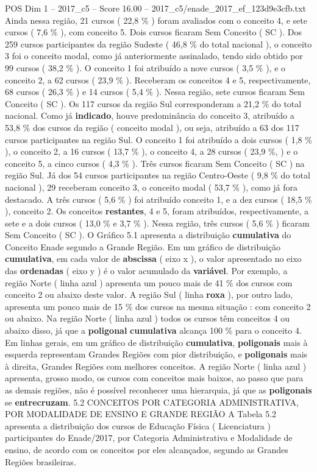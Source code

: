 \begin{textsample}{POS Dim 1 – 2017\_c5 – Score 16.00 – 2017\_c5/enade\_2017\_ef\_123d9e3cfb.txt}
Ainda nessa região, 21 cursos ( 22,8 \% ) foram avaliados com o conceito 4, e sete cursos ( 7,6 \% ), com conceito 5.
Dois cursos ficaram Sem Conceito ( SC ).
Dos 259 cursos participantes da região Sudeste ( 46,8 \% do total nacional ), o conceito 3 foi o conceito modal, como já anteriormente assinalado, tendo sido obtido por 99 cursos ( 38,2 \% ).
O conceito 1 foi atribuído a nove cursos ( 3,5 \% ), e o conceito 2, a 62 cursos ( 23,9 \% ).
Receberam os conceitos 4 e 5, respectivamente, 68 cursos ( 26,3 \% ) e 14 cursos ( 5,4 \% ).
Nessa região, sete cursos ficaram Sem Conceito ( SC ).
Os 117 cursos da região Sul corresponderam a 21,2 \% do total nacional.
Como já \textbf{indicado}, houve predominância do conceito 3, atribuído a 53,8 \% dos cursos da região ( conceito modal ), ou seja, atribuído a 63 dos 117 cursos participantes na região Sul.
O conceito 1 foi atribuído a dois cursos ( 1,8 \% ), o conceito 2, a 16 cursos ( 13,7 \% ), o conceito 4, a 28 cursos ( 23,9 \%, ) e o conceito 5, a cinco cursos ( 4,3 \% ).
Três cursos ficaram Sem Conceito ( SC ) na região Sul.
Já dos 54 cursos participantes na região Centro-Oeste ( 9,8 \% do total nacional ), 29 receberam conceito 3, o conceito modal ( 53,7 \% ), como já fora destacado.
A três cursos ( 5,6 \% ) foi atribuído conceito 1, e a dez cursos ( 18,5 \% ), conceito 2.
Os conceitos \textbf{restantes}, 4 e 5, foram atribuídos, respectivamente, a sete e a dois cursos ( 13,0 \% e 3,7 \% ).
Nessa região, três cursos ( 5,6 \% ) ficaram Sem Conceito ( SC ).
O Gráfico 5.1 apresenta a distribuição \textbf{cumulativa} do Conceito Enade segundo a Grande Região.
Em um gráfico de distribuição \textbf{cumulativa}, em cada valor de \textbf{abscissa} ( eixo x ), o valor apresentado no eixo das \textbf{ordenadas} ( eixo y ) é o valor acumulado da \textbf{variável}.
Por exemplo, a região Norte ( linha azul ) apresenta um pouco mais de 41 \% dos cursos com conceito 2 ou abaixo deste valor.
A região Sul ( linha \textbf{roxa} ), por outro lado, apresenta um pouco mais de 15 \% dos cursos na mesma situação : com conceito 2 ou abaixo.
Na região Norte ( linha azul ) todos os cursos têm conceitos 4 ou abaixo disso, já que a \textbf{poligonal} \textbf{cumulativa} alcança 100 \% para o conceito 4.
Em linhas gerais, em um gráfico de distribuição \textbf{cumulativa}, \textbf{poligonais} mais à esquerda representam Grandes Regiões com pior distribuição, e \textbf{poligonais} mais à direita, Grandes Regiões com melhores conceitos.
A região Norte ( linha azul ) apresenta, grosso modo, os cursos com conceitos mais baixos, ao passo que para as demais regiões, não é possível reconhecer uma hierarquia, já que as \textbf{poligonais} se \textbf{entrecruzam}. 5.2 CONCEITOS POR CATEGORIA ADMINISTRATIVA, POR MODALIDADE DE ENSINO E GRANDE REGIÃO A Tabela 5.2 apresenta a distribuição dos cursos de Educação Física ( Licenciatura ) participantes do Enade/2017, por Categoria Administrativa e Modalidade de ensino, de acordo com os conceitos por eles alcançados, segundo as Grandes Regiões brasileiras.

\end{textsample}
